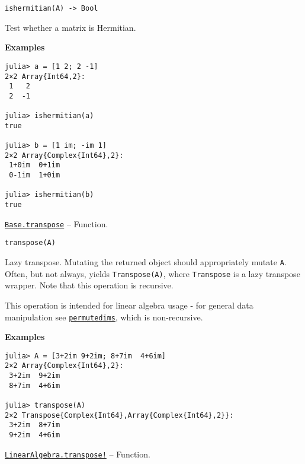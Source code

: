 \begin{adjustwidth}{2em}{0pt}


\begin{verbatim}
ishermitian(A) -> Bool
\end{verbatim}

Test whether a matrix is Hermitian.

\textbf{Examples}


\begin{verbatim}
julia> a = [1 2; 2 -1]
2×2 Array{Int64,2}:
 1   2
 2  -1

julia> ishermitian(a)
true

julia> b = [1 im; -im 1]
2×2 Array{Complex{Int64},2}:
 1+0im  0+1im
 0-1im  1+0im

julia> ishermitian(b)
true
\end{verbatim}



\end{adjustwidth}
\hypertarget{12700837529519091997}{} 
\hyperlink{12700837529519091997}{\texttt{Base.transpose}}  -- {Function.}

\begin{adjustwidth}{2em}{0pt}


\begin{verbatim}
transpose(A)
\end{verbatim}

Lazy transpose. Mutating the returned object should appropriately mutate \texttt{A}. Often, but not always, yields \texttt{Transpose(A)}, where \texttt{Transpose} is a lazy transpose wrapper. Note that this operation is recursive.

This operation is intended for linear algebra usage - for general data manipulation see \hyperlink{10913801624539723467}{\texttt{permutedims}}, which is non-recursive.

\textbf{Examples}


\begin{verbatim}
julia> A = [3+2im 9+2im; 8+7im  4+6im]
2×2 Array{Complex{Int64},2}:
 3+2im  9+2im
 8+7im  4+6im

julia> transpose(A)
2×2 Transpose{Complex{Int64},Array{Complex{Int64},2}}:
 3+2im  8+7im
 9+2im  4+6im
\end{verbatim}



\end{adjustwidth}
\hypertarget{11048480146030319791}{} 
\hyperlink{11048480146030319791}{\texttt{LinearAlgebra.transpose!}}  -- {Function.}

